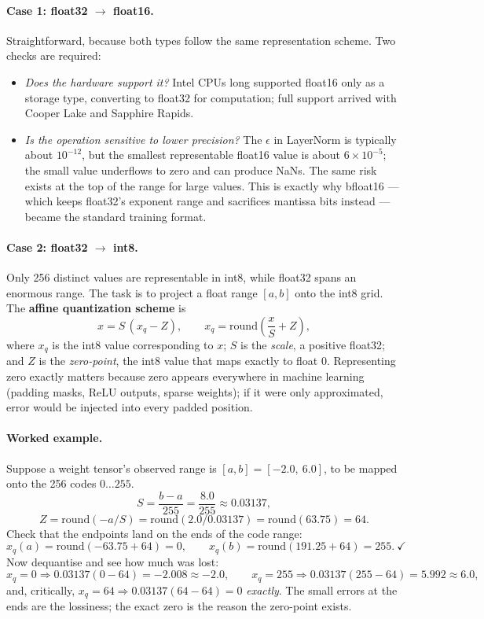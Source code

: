 \documentclass[11pt,a4paper]{article}
\begin{document}
\paragraph{Case 1: float32 $\rightarrow$ float16.} Straightforward, because both types follow
the same representation scheme. Two checks are required:
\begin{itemize}
\item \emph{Does the hardware support it?} Intel CPUs long supported float16 only as a
  storage type, converting to float32 for computation; full support arrived with Cooper Lake
  and Sapphire Rapids.
\item \emph{Is the operation sensitive to lower precision?} The $\epsilon$ in LayerNorm is
  typically about $10^{-12}$, but the smallest representable float16 value is about
  $6 \times 10^{-5}$; the small value underflows to zero and can produce NaNs. The same risk
  exists at the top of the range for large values. This is exactly why bfloat16 --- which
  keeps float32's exponent range and sacrifices mantissa bits instead --- became the standard
  training format.
\end{itemize}

\paragraph{Case 2: float32 $\rightarrow$ int8.} Only 256 distinct values are representable in
int8, while float32 spans an enormous range. The task is to project a float range $[a,b]$ onto
the int8 grid. The \textbf{affine quantization scheme} is
\[
x = S\,(x_q - Z), \qquad x_q = \mathrm{round}\!\left(\frac{x}{S} + Z\right),
\]
where $x_q$ is the int8 value corresponding to $x$; $S$ is the \emph{scale}, a positive
float32; and $Z$ is the \emph{zero-point}, the int8 value that maps exactly to float 0.
Representing zero exactly matters because zero appears everywhere in machine learning
(padding masks, ReLU outputs, sparse weights); if it were only approximated, error would be
injected into every padded position.

\paragraph{Worked example.} Suppose a weight tensor's observed range is
$[a, b] = [-2.0,\ 6.0]$, to be mapped onto the 256 codes $0 \ldots 255$.
\[
S = \frac{b - a}{255} = \frac{8.0}{255} \approx 0.03137,
\]
\[
Z = \mathrm{round}(-a/S) = \mathrm{round}(2.0/0.03137) = \mathrm{round}(63.75) = 64 .
\]
Check that the endpoints land on the ends of the code range:
\[
x_q(a) = \mathrm{round}(-63.75 + 64) = 0, \qquad
x_q(b) = \mathrm{round}(191.25 + 64) = 255. \ \checkmark
\]
Now dequantise and see how much was lost:
\[
x_q = 0 \Rightarrow 0.03137(0 - 64) = -2.008 \approx -2.0, \qquad
x_q = 255 \Rightarrow 0.03137(255 - 64) = 5.992 \approx 6.0,
\]
and, critically, $x_q = 64 \Rightarrow 0.03137(64-64) = 0$ \emph{exactly}. The small errors at
the ends are the lossiness; the exact zero is the reason the zero-point exists.
\end{document}
